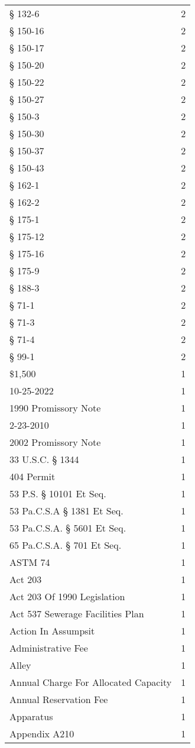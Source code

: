 \begin{longtable}{p{} p{}}
§ 132-6 & 2 \\
§ 150-16 & 2 \\
§ 150-17 & 2 \\
§ 150-20 & 2 \\
§ 150-22 & 2 \\
§ 150-27 & 2 \\
§ 150-3 & 2 \\
§ 150-30 & 2 \\
§ 150-37 & 2 \\
§ 150-43 & 2 \\
§ 162-1 & 2 \\
§ 162-2 & 2 \\
§ 175-1 & 2 \\
§ 175-12 & 2 \\
§ 175-16 & 2 \\
§ 175-9 & 2 \\
§ 188-3 & 2 \\
§ 71-1 & 2 \\
§ 71-3 & 2 \\
§ 71-4 & 2 \\
§ 99-1 & 2 \\
\$1,500 & 1 \\
10-25-2022 & 1 \\
1990 Promissory Note & 1 \\
2-23-2010 & 1 \\
2002 Promissory Note & 1 \\
33 U.S.C. § 1344 & 1 \\
404 Permit & 1 \\
53 P.S. § 10101 Et Seq. & 1 \\
53 Pa.C.S.A § 1381 Et Seq. & 1 \\
53 Pa.C.S.A. § 5601 Et Seq. & 1 \\
65 Pa.C.S.A. § 701 Et Seq. & 1 \\
ASTM 74 & 1 \\
Act 203 & 1 \\
Act 203 Of 1990 Legislation & 1 \\
Act 537 Sewerage Facilities Plan & 1 \\
Action In Assumpsit & 1 \\
Administrative Fee & 1 \\
Alley & 1 \\
Annual Charge For Allocated Capacity & 1 \\
Annual Reservation Fee & 1 \\
Apparatus & 1 \\
Appendix A210 & 1 \\

\end{longtable}
